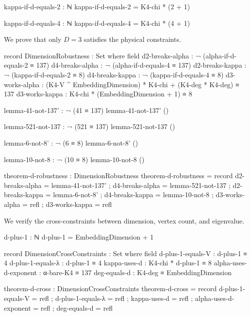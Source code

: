 \documentclass[11pt,a4paper]{book}
\begin{document}
\begin{code}
kappa-if-d-equals-2 : ℕ
kappa-if-d-equals-2 = K4-chi * (2 + 1)

kappa-if-d-equals-4 : ℕ
kappa-if-d-equals-4 = K4-chi * (4 + 1)
\end{code}

We prove that only $D=3$ satisfies the physical constraints.

\begin{code}
record DimensionRobustness : Set where
  field
    d2-breaks-alpha  : ¬ (alpha-if-d-equals-2 ≡ 137)
    d4-breaks-alpha  : ¬ (alpha-if-d-equals-4 ≡ 137)
    d2-breaks-kappa  : ¬ (kappa-if-d-equals-2 ≡ 8)
    d4-breaks-kappa  : ¬ (kappa-if-d-equals-4 ≡ 8)
    d3-works-alpha   : (K4-V ^ EmbeddingDimension) * K4-chi + (K4-deg * K4-deg) ≡ 137
    d3-works-kappa   : K4-chi * (EmbeddingDimension + 1) ≡ 8

lemma-41-not-137' : ¬ (41 ≡ 137)
lemma-41-not-137' ()

lemma-521-not-137 : ¬ (521 ≡ 137)
lemma-521-not-137 ()

lemma-6-not-8' : ¬ (6 ≡ 8)
lemma-6-not-8' ()

lemma-10-not-8 : ¬ (10 ≡ 8)
lemma-10-not-8 ()

theorem-d-robustness : DimensionRobustness
theorem-d-robustness = record
  { d2-breaks-alpha  = lemma-41-not-137'
  ; d4-breaks-alpha  = lemma-521-not-137
  ; d2-breaks-kappa  = lemma-6-not-8'
  ; d4-breaks-kappa  = lemma-10-not-8
  ; d3-works-alpha   = refl
  ; d3-works-kappa   = refl
  }
\end{code}

We verify the cross-constraints between dimension, vertex count, and eigenvalue.

\begin{code}
d-plus-1 : ℕ
d-plus-1 = EmbeddingDimension + 1

record DimensionCrossConstraints : Set where
  field
    d-plus-1-equals-V     : d-plus-1 ≡ 4
    d-plus-1-equals-λ     : d-plus-1 ≡ 4
    kappa-uses-d          : K4-chi * d-plus-1 ≡ 8
    alpha-uses-d-exponent : α-bare-K4 ≡ 137
    deg-equals-d          : K4-deg ≡ EmbeddingDimension

theorem-d-cross : DimensionCrossConstraints
theorem-d-cross = record
  { d-plus-1-equals-V     = refl
  ; d-plus-1-equals-λ     = refl
  ; kappa-uses-d          = refl
  ; alpha-uses-d-exponent = refl
  ; deg-equals-d          = refl
  }
\end{code}
\end{document}
